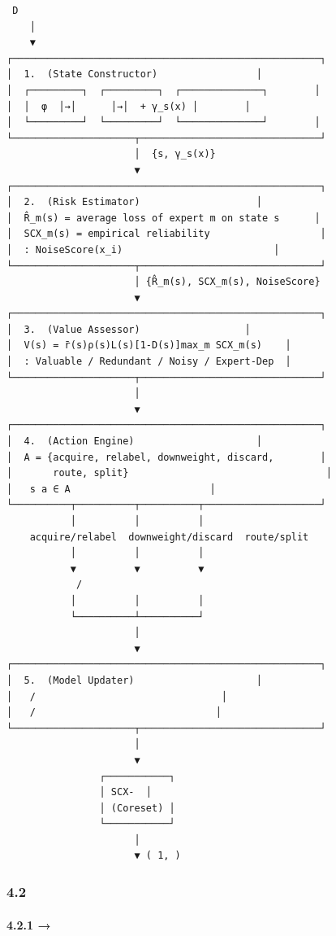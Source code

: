 \documentclass[
  12pt,
]{article}
\begin{document}
\begin{verbatim}
 D
    │
    ▼
┌─────────────────────────────────────────────────────┐
│  1.  (State Constructor)                 │
│  ┌─────────┐  ┌─────────┐  ┌──────────────┐        │
│  │  φ  │→│      │→│  + γ_s(x) │        │
│  └─────────┘  └─────────┘  └──────────────┘        │
└─────────────────────┬───────────────────────────────┘
                      │  {s, γ_s(x)}
                      ▼
┌─────────────────────────────────────────────────────┐
│  2.  (Risk Estimator)                    │
│  R̂_m(s) = average loss of expert m on state s      │
│  SCX_m(s) = empirical reliability                   │
│  : NoiseScore(x_i)                          │
└─────────────────────┬───────────────────────────────┘
                      │ {R̂_m(s), SCX_m(s), NoiseScore}
                      ▼
┌─────────────────────────────────────────────────────┐
│  3.  (Value Assessor)                  │
│  V(s) = r̄(s)ρ(s)L(s)[1-D(s)]max_m SCX_m(s)    │
│  : Valuable / Redundant / Noisy / Expert-Dep  │
└─────────────────────┬───────────────────────────────┘
                      │ 
                      ▼
┌─────────────────────────────────────────────────────┐
│  4.  (Action Engine)                     │
│  A = {acquire, relabel, downweight, discard,        │
│       route, split}                                  │
│   s a ∈ A                        │
└──────────┬──────────┬──────────┬────────────────────┘
           │          │          │
    acquire/relabel  downweight/discard  route/split
           │          │          │
           ▼          ▼          ▼
            /
           │          │          │
           └──────────┴──────────┘
                      │
                      ▼
┌─────────────────────────────────────────────────────┐
│  5.  (Model Updater)                     │
│   /                                │
│   /                               │
└─────────────────────┬───────────────────────────────┘
                      │
                      ▼
                ┌───────────┐
                │ SCX-  │
                │ (Coreset) │
                └───────────┘
                      │
                      ▼ ( 1, )
\end{verbatim}

\subsubsection{4.2
}\label{ux6a21ux5757ux95f4ux63a5ux53e3ux5951ux7ea6}

\paragraph{4.2.1  →
}\label{ux72b6ux6001ux6784ux9020ux5f15ux64ce-ux98ceux9669ux8bc4ux4f30ux6a21ux5757}
\end{document}
